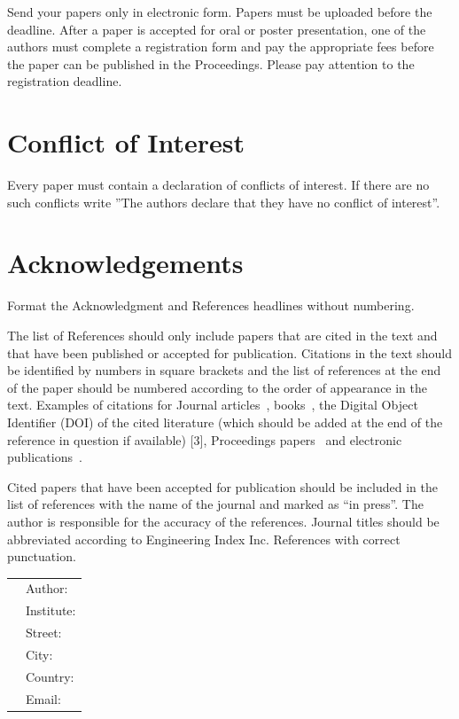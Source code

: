 \documentclass[nouppercase]{ifmbe}
\begin{document}
Send your papers only in electronic form. Papers must be uploaded before
the deadline. After a paper is accepted for oral or poster presentation,
one of the authors must complete a registration form and pay the
appropriate fees before the paper can be published in the Proceedings.
Please pay attention to the registration deadline.

\section*{Conflict of Interest}
Every paper must contain a declaration of conflicts of interest. If there are no such conflicts write ''The authors declare that they have no conflict of interest''.


\section*{Acknowledgements}

Format the Acknowledgment and References headlines without numbering.

\bigskip
The list of References should only include papers that are cited in the
text and that have been published or accepted for publication. Citations
in the text should be identified by numbers in square brackets and the
list of references at the end of the paper should be numbered according
to the order of appearance in the text. Examples of citations for
Journal articles~\cite{smith99}, books~\cite{south01}, the Digital
Object Identifier (DOI) of the cited literature (which should be added
at the end of the reference in question if available) [3], Proceedings
papers~\cite{lock03} and electronic publications~\cite{IFMBE}.

Cited papers that have been accepted for publication should be included
in the list of references with the name of the journal and marked as
``in press''. The author is responsible for the accuracy of the
references. Journal titles should be abbreviated according to
Engineering Index Inc. References with correct punctuation.



\begin{table}[h]
\footnotesize
        \begin{tabular}{ll}
        &Author: \\
        &Institute: \\
        &Street: \\
        &City: \\
        &Country:  \\
        &Email: \\
        \end{tabular}
\end{table}
\end{document}
